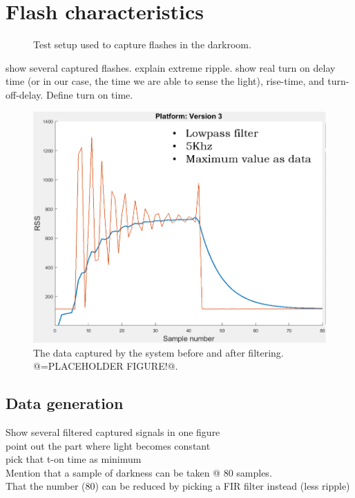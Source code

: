 \section{Flash characteristics}
\label{sec:Flash_characteristics}

\begin{figure}
	\centering     %
	\label{fig:Flashcapturing}
	\caption{Test setup used to capture flashes in the darkroom.}
\end{figure}

show several captured flashes.
explain extreme ripple.
show real turn on delay time (or in our case, the time we are able to sense the light), rise-time, and turn-off-delay.
Define turn on time.

\begin{figure}[!h]
	\includegraphics[width=\textwidth]{pics/66KhzFilter_placeholder.png}
	\caption{The data captured by the system before and after filtering. @=PLACEHOLDER FIGURE!@.}
	\label{fig:66KhzFilter}
\end{figure}

\subsection{Data generation}
\label{sec:Data_generation}
Show several filtered captured signals in one figure\\
point out the part where light becomes constant\\
pick that t-on time as minimum\\
Mention that a sample of darkness can be taken @ 80 samples.\\
That the number (80) can be reduced by picking a FIR filter instead (less ripple)\\

